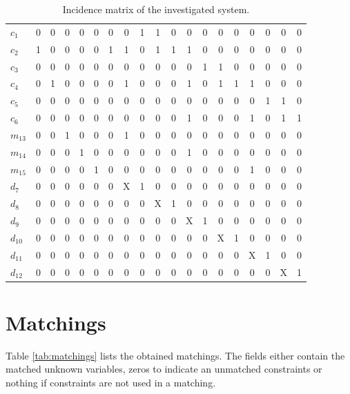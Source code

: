 \documentclass[a4,11pt]{article}
\begin{document}
\begin{table}[!htb]
\begin{tabular}{|l|cccccc|cccccccccccc|}
\hline
$c_1$  & 0 & 0 & 0 & 0 & 0 & 0 & 0 & 1 & 1 & 0 & 0 & 0 & 0 & 0 & 0 & 0 & 0 & 0 \\ 
$c_2$  & 1 & 0 & 0 & 0 & 0 & 1 & 1 & 0 & 1 & 1 & 1 & 0 & 0 & 0 & 0 & 0 & 0 & 0 \\ 
$c_3$  & 0 & 0 & 0 & 0 & 0 & 0 & 0 & 0 & 0 & 0 & 0 & 1 & 1 & 0 & 0 & 0 & 0 & 0 \\ 
$c_4$  & 0 & 1 & 0 & 0 & 0 & 0 & 1 & 0 & 0 & 0 & 1 & 0 & 1 & 1 & 1 & 0 & 0 & 0 \\ 
$c_5$  & 0 & 0 & 0 & 0 & 0 & 0 & 0 & 0 & 0 & 0 & 0 & 0 & 0 & 0 & 0 & 1 & 1 & 0 \\ 
$c_6$  & 0 & 0 & 0 & 0 & 0 & 0 & 0 & 0 & 0 & 0 & 1 & 0 & 0 & 0 & 1 & 0 & 1 & 1 \\ 
$m_{13}$  & 0 & 0 & 1 & 0 & 0 & 0 & 1 & 0 & 0 & 0 & 0 & 0 & 0 & 0 & 0 & 0 & 0 & 0 \\ 
$m_{14}$  & 0 & 0 & 0 & 1 & 0 & 0 & 0 & 0 & 0 & 0 & 1 & 0 & 0 & 0 & 0 & 0 & 0 & 0 \\ 
$m_{15}$  & 0 & 0 & 0 & 0 & 1 & 0 & 0 & 0 & 0 & 0 & 0 & 0 & 0 & 0 & 1 & 0 & 0 & 0 \\ 
\hline
$d_7$  & 0 & 0 & 0 & 0 & 0 & 0 & X & 1 & 0 & 0 & 0 & 0 & 0 & 0 & 0 & 0 & 0 & 0 \\ 
$d_8$  & 0 & 0 & 0 & 0 & 0 & 0 & 0 & 0 & X & 1 & 0 & 0 & 0 & 0 & 0 & 0 & 0 & 0 \\ 
$d_9$  & 0 & 0 & 0 & 0 & 0 & 0 & 0 & 0 & 0 & 0 & X & 1 & 0 & 0 & 0 & 0 & 0 & 0 \\ 
$d_{10}$  & 0 & 0 & 0 & 0 & 0 & 0 & 0 & 0 & 0 & 0 & 0 & 0 & X & 1 & 0 & 0 & 0 & 0 \\ 
$d_{11}$  & 0 & 0 & 0 & 0 & 0 & 0 & 0 & 0 & 0 & 0 & 0 & 0 & 0 & 0 & X & 1 & 0 & 0 \\ 
$d_{12}$  & 0 & 0 & 0 & 0 & 0 & 0 & 0 & 0 & 0 & 0 & 0 & 0 & 0 & 0 & 0 & 0 & X & 1 \\ \hline
\end{tabular}
\caption{Incidence matrix of the investigated system.}
\label{tab:matrix}
\end{table}
\newpage
\section{Matchings}
Table \ref{tab:matchings} lists the obtained matchings. The fields either contain the matched unknown variables, zeros to indicate an unmatched constraints or nothing if constraints are not used in a matching.\setlength\tabcolsep{2mm}
\end{document}
